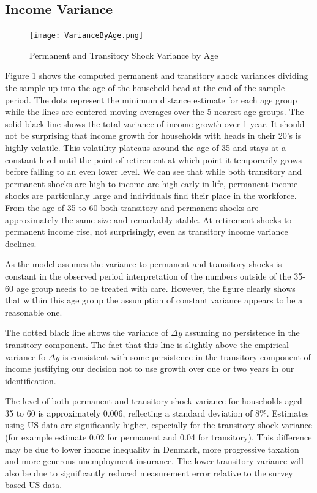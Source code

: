 \documentclass[titlepage]{\econtex}\newcommand{\texname}{IncomeUncertainty}
\begin{document}
\subsection{Income Variance} \label{inc_variance}
\begin{figure} 
\begin{centering}
	\texttt{[image: VarianceByAge.png]} 
	\caption{Permanent and Transitory Shock Variance by Age}
	\label{fig:VarianceByAge}
\end{centering}
\end{figure}
Figure \ref{fig:VarianceByAge} shows the computed permanent and transitory shock variances dividing the sample up into the age of the household head at the end of the sample period. The dots represent the minimum distance estimate for each age group while the lines are centered moving averages over the 5 nearest age groups. The solid black line shows the total variance of income growth over 1 year. It should not be surprising that income growth for households with heads in their 20's is highly volatile. This volatility plateaus around the age of 35 and stays at a constant level until the point of retirement at which point it temporarily grows before falling to an even lower level. We can see that while both transitory and permanent shocks are high to income are high early in life, permanent income shocks are particularly large and individuals find their place in the workforce. From the age of 35 to 60 both transitory and permanent shocks are approximately the same size and remarkably stable. At retirement shocks to permanent income rise, not surprisingly, even as transitory income variance declines.

As the model assumes the variance to permanent and transitory shocks is constant in the observed period interpretation of the numbers outside of the 35-60 age group needs to be treated with care. However, the figure clearly shows that within this age group the assumption of constant variance appears to be a reasonable one.

The dotted black line shows the variance of $\Delta y$ assuming no persistence in the transitory component. The fact that this line is slightly above the empirical variance fo $\Delta y$ is consistent with some persistence in the transitory component of income justifying our decision not to use growth over one or two years in our identification.

The level of both permanent and transitory shock variance for households aged 35 to 60 is approximately 0.006, reflecting a standard deviation of 8\%. Estimates using US data are significantly higher, especially for the transitory shock variance (for example \cite{carroll_nature_1997} estimate 0.02 for permanent and 0.04 for transitory). This difference may be due to lower income inequality in Denmark, more progressive taxation and more generous unemployment insurance. The lower transitory variance will also be due to significantly reduced measurement error relative to the survey based US data. 
\end{document}
